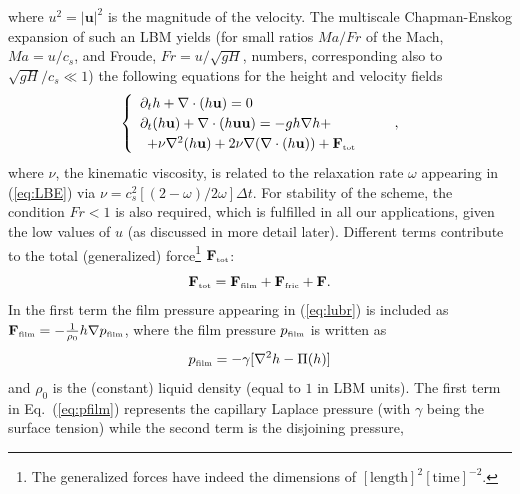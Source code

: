 where $u^2 = |\mathbf{u}|^2$ is the magnitude of the velocity.
The multiscale Chapman-Enskog expansion \cite{chapmanMathematicalTheoryNonuniform1990,enskogKinetischeTheorieVorgange1917} of such an LBM yields (for small ratios $Ma/Fr$ of the Mach, $Ma=u/c_s$, and Froude, $Fr = u/\sqrt{gH}$, numbers, corresponding also to $\sqrt{g H}/c_s \ll 1$) the following equations for the height and velocity fields~\cite{dellarNonhydrodynamicModesPriori2002,vanthangStudy1DLattice2010,salmonLatticeBoltzmannMethod1999}
\begin{equation}\label{eq:hydro}
\begin{cases}
\begin{array}{ll}
\partial_t h + \nabla \cdot (h \mathbf{u})  = 0 & \\ 
\partial_t (h \mathbf{u}) + \nabla \cdot (h \mathbf{u}\mathbf{u}) = -gh \nabla h +\\ 
\,\,\, +  \nu \nabla^2 (h\mathbf{u}) + 2\nu \nabla (\nabla \cdot (h\mathbf{u})) +
\mathbf{F}_{\mbox{\tiny{tot}}} 
\end{array}
\end{cases},
\end{equation}
where $\nu$, the kinematic viscosity, is related to the relaxation rate $\omega$ appearing in (\ref{eq:LBE}) via $\nu = c_s^2[(2-\omega)/2\omega]\Delta t$. 
For stability of the scheme, the condition $Fr < 1$ is also required, which is fulfilled in all our applications, given the low values of $u$ (as discussed in more detail later).
Different terms contribute to the total (generalized) force\footnote{The generalized forces have indeed the dimensions of $[\mbox{length}]^2[\mbox{time}]^{-2}$.} $\mathbf{F}_{\mbox{\tiny{tot}}}$:
\begin{equation}\label{eq:force}
\mathbf{F}_{\mbox{\tiny{tot}}} = \mathbf{F}_{\mbox{\tiny{film}}} + \mathbf{F}_{\mbox{\tiny{fric}}} + \mathbf{F}. 
\end{equation}
In the first term the film pressure appearing in (\ref{eq:lubr}) is included as
$\mathbf{F}_{\mbox{\tiny{film}}} = -\frac{1}{\rho_0}h\nabla p_{\mbox{\tiny{film}}}$, where the film pressure $p_{\mbox{\tiny{film}}}$ 
is written as
\begin{equation}\label{eq:pfilm}
p_{\mbox{\tiny{film}}} = - \gamma [\nabla^2 h -\Pi(h)]
\end{equation}
and $\rho_0$ is the (constant) liquid density (equal to $1$ in LBM units). 
The first term in Eq.~(\ref{eq:pfilm}) represents the capillary Laplace pressure (with $\gamma$ being the surface tension) while the second term is the disjoining pressure, 
